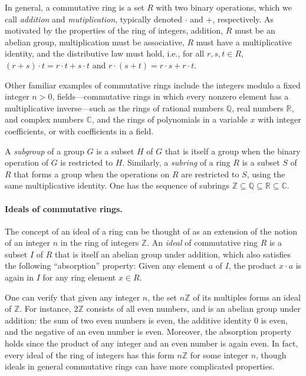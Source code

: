 \documentclass{article}
\begin{document}
In general, a commutative ring is a set $R$ with two binary operations, which
we call \emph{addition} and \emph{mutiplication}, typically denoted $\cdot$ and
$+$, respectively. As motivated by the properties of the ring of integers,
addition, $R$ must be an abelian group, multiplication must be associative, $R$
must have a multiplicative identity, and the distributive law must hold, i.e.,
for all $r, s, t \in R$, $(r+s)\cdot t = r \cdot t + s \cdot t$ and
$r \cdot (s+t) = r \cdot s + r \cdot t$.

Other familiar examples of commutative rings include the integers modulo a
fixed integer $n>0$, fields---commutative rings in which every nonzero element
has a multiplicative inverse---such as the rings of rational numbers $\mathbb{Q}$, real
numbers $\mathbb{R}$, and complex numbers $\mathbb{C}$, and the rings
 of polynomials in a variable $x$ with
integer coefficients, or with coefficients in a field.

A \emph{subgroup} of a group $G$ is a subset  $H$ of $G$ that is itself a 
group when the binary operation of $G$ is restricted to $H$.
Similarly, a \emph{subring} of a ring $R$
is a subset $S$ of $R$ that forms a group when the operations on $R$ are 
restricted to $S$, using the same multiplicative identity.  
One has the sequence of subrings $\mathbb{Z} \subseteq \mathbb{Q} \subseteq \mathbb{R} \subseteq \mathbb{C}$. 

\paragraph{Ideals of commutative rings.}
The concept of an {ideal} of a ring can be thought of as an extension of the
notion of an integer $n$ in the ring of integers $\mathbb{Z}$. An \emph{ideal}
of commutative ring $R$ is a subset $I$ of $R$ that is itself an abelian group
under addition, which also satisfies the following ``absorption'' property:
Given any element $a$ of $I$, the product  $x \cdot a$ is again in $I$ for any
ring element $x \in R$. 

One can verify that given any integer $n$, the set $n\mathbb{Z}$ of its
multiples forms an ideal of $\mathbb{Z}$. For instance, $2 \mathbb{Z}$
consists of all even numbers, and is an abelian group under addition: the sum
of two even numbers is even, the additive identity $0$ is even, and the
negative of an even number is even. Moreover, the absorption property holds
since the product of any integer and an even number is again even. In fact,
every ideal of the ring of integers has this form $n\mathbb{Z}$ for some
integer $n$, though ideals in general commutative rings can have more
complicated properties. 
\end{document}
